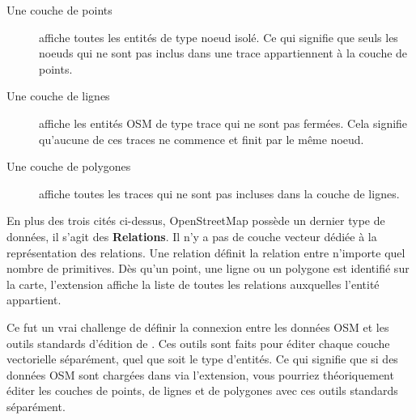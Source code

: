 \begin{description}
\item[Une couche de points ] affiche toutes les entités de type noeud isolé. Ce qui signifie que seuls les noeuds qui ne sont pas inclus dans une trace appartiennent à la couche de points.
\item [Une couche de lignes] affiche les entités OSM de type trace qui ne sont pas fermées. Cela signifie qu'aucune de ces traces ne commence et finit par le même noeud.
\item[Une couche de polygones] affiche toutes les traces qui ne sont pas incluses dans la couche de lignes.
\end{description}

En plus des trois cités ci-dessus, OpenStreetMap possède un dernier type de données, il s'agit des \textbf{Relations}. Il n'y a pas de couche vecteur dédiée à la représentation des relations. Une relation définit la relation entre n'importe quel nombre de primitives. Dès qu'un point, une ligne ou un polygone est identifié sur la carte, l'extension affiche la liste de toutes les relations auxquelles l'entité appartient.

Ce fut un vrai challenge de définir la connexion entre les données OSM et les outils standards d'édition de \qg. Ces outils sont faits pour éditer chaque couche vectorielle séparément, quel que soit le type d'entités. Ce qui signifie que si des données OSM sont chargées dans \qg via l'extension, vous pourriez théoriquement éditer les couches de points, de lignes et de polygones avec ces outils standards séparément.

